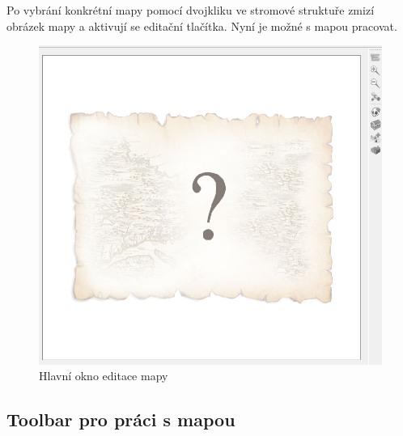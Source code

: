 \documentclass[12pt,a4paper,oneside]{article}
\begin{document}
Po vybrání konkrétní mapy pomocí dvojkliku ve stromové struktuře zmizí obrázek mapy a aktivují se editační tlačítka. Nyní je možné s mapou pracovat.
	\begin{figure}[h]
  		\centering  		
    		\includegraphics[width=0.8\linewidth]{images/map}
    		\caption{Hlavní okno editace mapy}
    		\label{fig:editace_strom_another}  	  		
  		\vfill
	\end{figure}
	
	\newpage
	
	\subsection{Toolbar pro práci s mapou}
	
\end{document}
